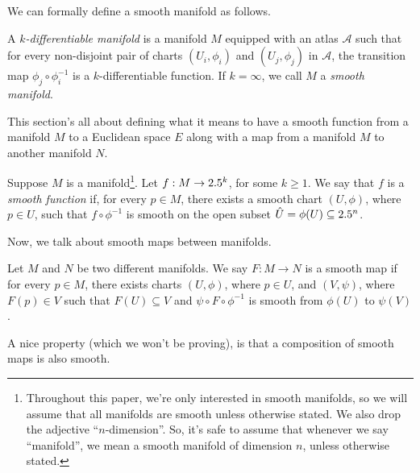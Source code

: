 We can formally define a smooth manifold as follows.
\begin{definition}
  A \emph{$k$-differentiable manifold} is a manifold $M$ equipped with an atlas $\mathcal{A}$ such that for every non-disjoint pair of charts $(U_i, \phi_i)$ and $(U_j, \phi_j)$ in $\mathcal{A}$, the transition map $\phi_j \circ \phi_i^{-1}$ is a $k$-differentiable function. If $k = \infty$, we call $M$ a \emph{smooth manifold}.
\end{definition}

\label{sub_sec:smooth_functions_and_maps}
This section's all about defining what it means to have a smooth function from a manifold $M$ to a Euclidean space $E$ along with a map from a manifold $M$ to another manifold $N$.
\begin{definition}
  Suppose $M$ is a manifold\footnote{Throughout this paper, we're only interested in smooth manifolds, so we will assume that all manifolds are smooth unless otherwise stated. We also drop the adjective ``$n$-dimension''. So, it's safe to assume that whenever we say ``manifold'', we mean a smooth manifold of dimension $n$, unless otherwise stated.}. Let $f : M \to 2.5^k$, for some $k \ge 1$. We say that $f$ is a \emph{smooth function} if, for every $p \in M$, there exists a smooth chart $(U, \phi)$, where $p \in U$, such that $f \circ \phi^{-1}$ is smooth on the open subset $\hat{U} = \phi(U) \subseteq 2.5^n$.
\end{definition}

Now, we talk about smooth maps between manifolds.
\begin{definition}
  Let $M$ and $N$ be two different manifolds. We say $F : M \to N$ is a smooth map if for every $p \in M$, there exists charts $(U, \phi)$, where $p \in U$, and $(V, \psi)$, where $F(p) \in V$ such that $F(U) \subseteq V$ and $\psi \circ F \circ \phi^{-1}$ is smooth from $\phi(U)$ to $\psi(V)$.
\end{definition}


A nice property (which we won't be proving), is that a composition of smooth maps is also smooth.



